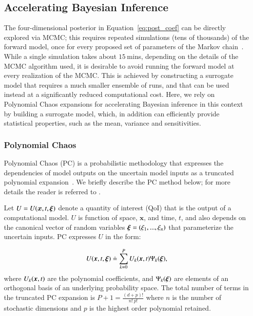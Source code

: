 \subsection{Accelerating Bayesian Inference}
\label{sec:uqpce}

The four-dimensional posterior in Equation~\eqref{eq:post_coef} can be directly
explored via MCMC; this requires repeated simulations (tens of thousands) of the forward \geoclaw model, 
once for every proposed set of parameters of the Markov chain~\cite{MarzoukNajm2009,Malinverno2002}. 
While a single \geoclaw simulation takes about $15~$mins, depending on the details of the MCMC algorithm used, 
it is desirable to avoid running the forward model at every realization of the MCMC. 
This is achieved by constructing a surrogate model that requires a much
smaller ensemble of \geoclaw runs, and that can be used instead
at a significantly reduced computational cost.  Here, we rely on
Polynomial Chaos expansions for accelerating Bayesian inference in this context 
by building a surrogate model, which, in addition can efficiently
provide statistical properties, such as the mean, variance and sensitivities. 

\subsubsection{Polynomial Chaos}

Polynomial Chaos (PC) is a probabilistic methodology that expresses the 
dependencies of model outputs on the uncertain model inputs
as a truncated polynomial expansion~\citep{Villegas2012,Lin2009,Xiu2004}.
We briefly describe the PC method below; for more details 
the reader is referred to \citep{LeMaitreKnio2010}.

Let $U=U(\bm{x},t,\xxi)$ denote a quantity of 
interest (QoI) that is the output of a computational model.
$U$ is function of space, $\bm{x}$, and time, $t$, and 
also depends on the canonical vector of random variables $\xxi=(\xi_1,...,\xi_n)$
that parameterize the uncertain inputs. 
PC expresses $U$ in the form:

\begin{equation}
  U(\xbold,t,\xxi) \doteq \sum_{k = 0}^P U_k(\xbold,t) \Psi_k(\xxi),
\label{eq:stochseries}
\end{equation} 
where $U_k(\xbold,t)$ are the polynomial coefficients, and
$\Psi_k(\xxi)$ are elements of an orthogonal basis of an underlying probability
space. The total number of terms in the truncated PC expansion is
$P+1 = \frac{(d+p)! }{n!\ p!}$ where $n$ is the number of stochastic dimensions and $p$ is the highest order
polynomial retained. 

